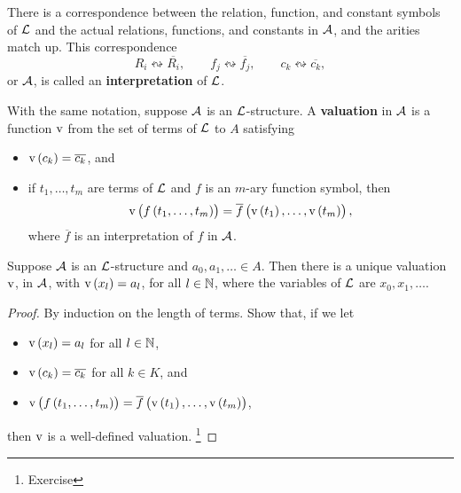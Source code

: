 There is a correspondence between the relation, function, and constant symbols of $ \mathcal{L} $ and the actual relations, functions, and constants in $ \mathcal{A} $, and the arities match up. This correspondence
$$ R_i \leftrightsquigarrow \overline{R_i}, \qquad f_j \leftrightsquigarrow \overline{f_j}, \qquad c_k \leftrightsquigarrow \overline{c_k}, $$
or $ \mathcal{A} $, is called an \textbf{interpretation} of $ \mathcal{L} $.

\pagebreak

\begin{definition}
With the same notation, suppose $ \mathcal{A} $ is an $ \mathcal{L} $-structure. A \textbf{valuation} in $ \mathcal{A} $ is a function $ \mathrm{v} $ from the set of terms of $ \mathcal{L} $ to $ A $ satisfying
\begin{itemize}
\item $ \v\br{c_k} = \overline{c_k} $, and
\item if $ t_1, \dots, t_m $ are terms of $ \mathcal{L} $ and $ f $ is an $ m $-ary function symbol, then
$$ \v\br{f\br{t_1, \dots, t_m}} = \overline{f}\br{\v\br{t_1}, \dots, \v\br{t_m}}, $$
where $ \overline{f} $ is an interpretation of $ f $ in $ \mathcal{A} $.
\end{itemize}
\end{definition}

\begin{lemma}
Suppose $ \mathcal{A} $ is an $ \mathcal{L} $-structure and $ a_0, a_1, \dots \in A $. Then there is a unique valuation $ \mathrm{v} $, in $ \mathcal{A} $, with $ \v\br{x_l} = a_l $, for all $ l \in \mathbb{N} $, where the variables of $ \mathcal{L} $ are $ x_0, x_1, \dots $.
\end{lemma}

\begin{proof}
By induction on the length of terms. Show that, if we let
\begin{itemize}
\item $ \v\br{x_l} = a_l $ for all $ l \in \mathbb{N} $,
\item $ \v\br{c_k} = \overline{c_k} $ for all $ k \in K $, and
\item $ \v\br{f\br{t_1, \dots, t_m}} = \overline{f}\br{\v\br{t_1}, \dots, \v\br{t_m}} $,
\end{itemize}
then $ \mathrm{v} $ is a well-defined valuation. \footnote{Exercise}
\end{proof}

